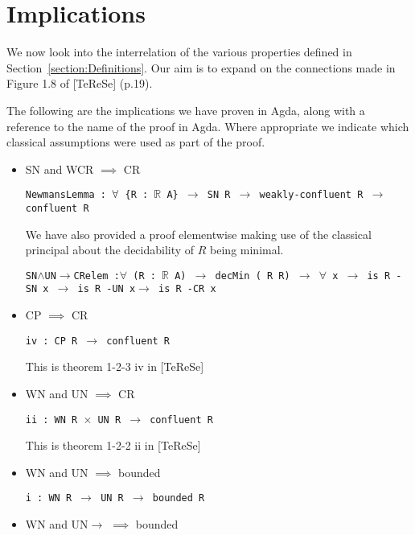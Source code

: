 \documentclass{scrartcl}
\begin{document}
\section{Implications}
{\small
We now look into the interrelation of the various properties defined in Section~\ref{section:Definitions}. Our aim is to expand on the
connections made in Figure 1.8 of [TeReSe] (p.19).

The following are the implications we have proven in Agda, along with a reference to the name of the proof in Agda. Where appropriate we indicate
which classical assumptions were used as part of the proof.

\begin{itemize}
  \item SN and WCR $\implies$ CR

\texttt{NewmansLemma : $\mathnormal{\forall}$ \{R : $\mathbb{R}$ A\} $\to$ SN R $\to$ weakly-confluent R $\to$ confluent R}


We have also provided a proof elementwise making use of the classical principal
about the decidability of $R$ being minimal.


\texttt{SN$\land$UN$\to$CRelem :\newline $\forall$ (R : $\mathbb{R}$ A) $\to$ decMin (~R R) $\to$ $\forall$ x $\to$ is R -SN x $\to$ is R -UN x$\to$ is R -CR x}


\item{CP $\implies$ CR}

\texttt{iv : CP R $\to$ confluent R}

This is theorem 1-2-3 iv in [TeReSe]

\item{WN and UN $\implies$ CR}

\texttt{ii : WN R $\times$ UN R $\to$ confluent R}

This is theorem 1-2-2 ii in [TeReSe]

\item{WN and UN $\implies$ bounded}

\texttt{i : WN R $\to$ UN R $\to$ bounded R}




\item{WN and UN$\to$ $\implies$ bounded}


\end{itemize}}
\end{document}
